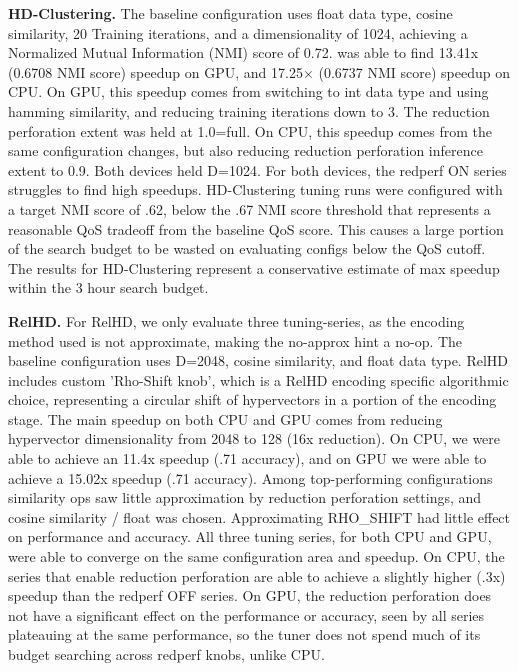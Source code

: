 
\textbf{HD-Clustering.}
The baseline configuration uses float data type, cosine similarity, 20 Training iterations, and a dimensionality of 1024, achieving a Normalized Mutual Information (NMI) score of 0.72. \pname{} was able to find 13.41x (0.6708 NMI score) speedup on GPU, and 17.25$\times$ (0.6737 NMI score) speedup on CPU. On GPU, this speedup comes from switching to int data type and using hamming similarity, and reducing training iterations down to 3. The reduction perforation extent was held at 1.0=full. On CPU, this speedup comes from the same configuration changes, but also reducing reduction perforation inference extent to 0.9. Both devices held D=1024. For both devices, the redperf ON series struggles to find high speedups. HD-Clustering tuning runs were configured with a target NMI score of .62, below the .67 NMI score threshold that represents a reasonable QoS tradeoff from the baseline QoS score. This causes a large portion of the search budget to be wasted on evaluating configs below the QoS cutoff. The results for HD-Clustering represent a conservative estimate of max speedup within the 3 hour search budget. %

\textbf{RelHD.}
For RelHD, we only evaluate three tuning-series, as the encoding method used is not approximate, making the no-approx hint a no-op. The baseline configuration uses D=2048, cosine similarity, and float data type. RelHD includes custom 'Rho-Shift knob', which is a RelHD encoding specific algorithmic choice, representing a circular shift of hypervectors in a portion of the encoding stage. The main speedup on both CPU and GPU comes from reducing hypervector dimensionality from 2048 to 128 (16x reduction). On CPU, we were able to achieve an 11.4x speedup (.71 accuracy), and on GPU we were able to achieve a 15.02x speedup (.71 accuracy). Among top-performing configurations similarity ops saw little approximation by reduction perforation settings, and cosine similarity / float was chosen. Approximating RHO\_SHIFT had little effect on performance and accuracy. All three tuning series, for both CPU and GPU, were able to converge on the same configuration area and speedup. On CPU, the series that enable reduction perforation are able to achieve a slightly higher (.3x) speedup than the redperf OFF series. On GPU, the reduction perforation does not have a significant effect on the performance or accuracy, seen by all series plateauing at the same performance, so the tuner does not spend much of its budget searching across redperf knobs, unlike CPU.

